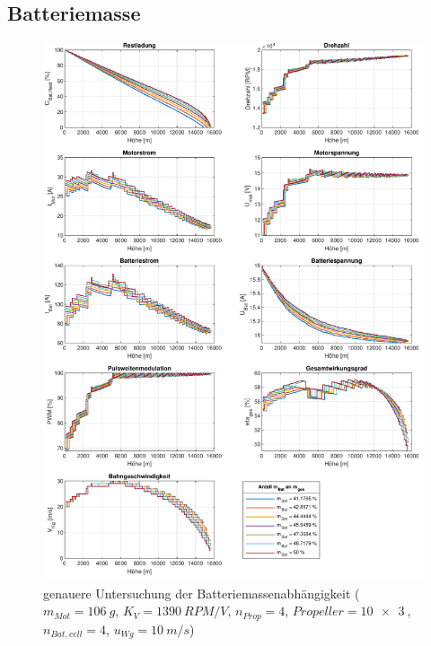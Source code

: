 \begin{appendix}
\section{Batteriemasse}
\begin{figure}[H]
\centering
	\includegraphics[scale=0.7]{Diagramme/Batteriemasse_genauer.pdf}
	\caption{genauere Untersuchung der Batteriemassenabhängigkeit (\ensuremath{m_{Mot}=\SI{106}{g}}, \ensuremath{K_V=\SI{1390}{RPM/V}}, \ensuremath{n_{Prop}=4}, \ensuremath{Propeller=\SI{10x3}{}}, \ensuremath{n_{Bat,cell}=4}, \ensuremath{u_{Wg}=\SI{10}{m/s}})}
	\label{abb:batteriemasse_genauer}
\end{figure}


\end{appendix}

